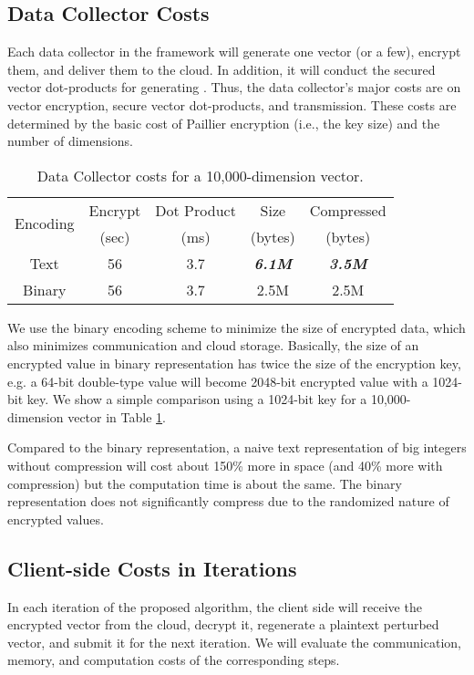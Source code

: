 \documentclass[10pt, conference, compsocconf]{IEEEtran}
\begin{document}
\subsection{Data Collector Costs}
Each data collector in the framework will generate one vector (or a few), encrypt them, and deliver them to the cloud. In addition, it will conduct the secured vector dot-products for generating . Thus, the data collector's major costs are on vector encryption, secure vector dot-products, and transmission. These costs are determined by the basic cost of Paillier encryption (i.e., the key size) and the number of dimensions.

\begin{table}[tbh]
\centering
\scriptsize
\begin{tabular}{|c|c|c|c|c|}
\hline
\multirow{2}{*}{Encoding} & Encrypt & Dot Product & Size & Compressed \\
& (sec) & (ms) & (bytes) & (bytes) \\
\hline
Text& 56 & 3.7 & \textbf{\emph{6.1M}} & \textbf{\emph{3.5M}} \\
Binary& 56 & 3.7 & 2.5M & 2.5M\\
\hline
\end{tabular}
\caption{Data Collector costs for a 10,000-dimension vector.} \label{tab:collector-costs}
\vspace{-0.5cm}
\normalsize
\end{table}
 
We use the binary encoding scheme to minimize the size of encrypted data, which also minimizes communication and cloud storage. Basically, the size of an encrypted value in binary representation has twice the size of the encryption key, e.g. a 64-bit double-type value will become 2048-bit encrypted value with a 1024-bit key. We show a simple comparison using a 1024-bit key for a 10,000-dimension vector in Table \ref{tab:collector-costs}. 

Compared to the binary representation, a naive text representation of big integers without compression will cost about 150\% more in space (and 40\% more with compression) but the computation time is about the same. 
The binary representation does not significantly compress due to the randomized nature of encrypted values. 

\subsection{Client-side Costs in Iterations}
In each iteration of the proposed algorithm, the client side will receive the encrypted vector  from the cloud, decrypt it, regenerate a plaintext perturbed vector, and submit it for the next iteration. We will evaluate the communication, memory, and computation costs of the corresponding steps.  
\end{document}
